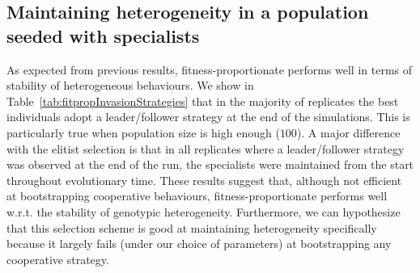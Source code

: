   \subsection{Maintaining heterogeneity in a population seeded with specialists}
    \begin{table}[ht]
      \caption{\textbf{Strategies evolved by the best individuals under fitness-proportionate selection when adding followers.} Repartition of the different strategies adopted by the best individuals at the last evaluation in each of the replicates for different population sizes \(N\). We indicate in each cell the number of simulations where a particular strategy evolved. Populations were evolved under a fitness-proportionate selection. The population was initially seeded with a population of leaders in which we added a specific amount of followers. In the table "L/F" stands for leader/follower and "NC" for "Non-Cooperative".}
      \label{tab:fitpropInvasionStrategies}
    \end{table}

    As expected from previous results, fitness-proportionate performs well in terms of stability of heterogeneous behaviours. We show in Table~\ref{tab:fitpropInvasionStrategies} that in the majority of replicates the best individuals adopt a leader/follower strategy at the end of the simulations. This is particularly true when population size is high enough ($100$). A major difference with the elitist selection is that in all replicates where a leader/follower strategy was observed at the end of the run, the specialists were maintained from the start throughout evolutionary time. These results suggest that, although not efficient at bootstrapping cooperative behaviours, fitness-proportionate performs well w.r.t. the stability of genotypic heterogeneity. Furthermore, we can hypothesize that this selection scheme is good at maintaining heterogeneity specifically because it largely fails (under our choice of parameters) at bootstrapping any cooperative strategy.


